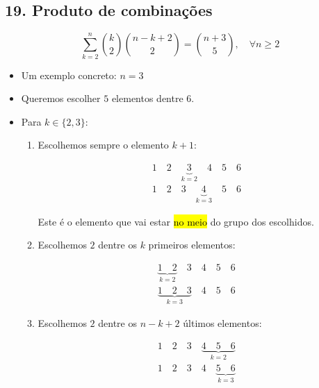 \documentclass[
  11pt]{report}
\begin{document}
\hypertarget{produto-de-combinauxe7uxf5es}{%
\subsection*{19. Produto de combinações}\label{produto-de-combinauxe7uxf5es}}

\begin{rmdbox}
\[
\sum_{k=2}^n \binom k2 \binom{n-k+2}{2} = \binom{n+3}{5}, \quad \forall n \geq 2
\]

\end{rmdbox}

\begin{itemize}
\item
  Um exemplo concreto: $n = 3$
\item
  Queremos escolher $5$ elementos dentre $6$.
\item
  Para $k \in \{ 2, 3 \}$:

  \begin{enumerate}
  \def\labelenumi{\arabic{enumi}.}
  \item
    Escolhemos sempre o elemento $k + 1$:

    \[
    \begin{aligned}
    1 \quad 2 \quad \underbrace{3}_{k = 2} \quad 4 \quad 5 \quad 6 \\
    1 \quad 2 \quad 3 \quad \underbrace{4}_{k = 3} \quad 5 \quad 6
    \end{aligned}
    \]

    Este é o elemento que vai estar {\hl{no meio}} do grupo dos escolhidos.
  \item
    Escolhemos $2$ dentre os $k$ primeiros elementos:

    \[
    \begin{aligned}
    \underbrace{1 \quad 2}_{k = 2} \quad 3 \quad 4 \quad 5 \quad 6 \\
    \underbrace{1 \quad 2 \quad 3}_{k = 3} \quad 4 \quad 5 \quad 6
    \end{aligned}
    \]
  \item
    Escolhemos $2$ dentre os $n - k + 2$ últimos elementos:

    \[
    \begin{aligned}
    1 \quad 2 \quad 3 \quad \underbrace{4 \quad 5 \quad 6}_{k = 2}\\
    1 \quad 2 \quad 3 \quad 4 \quad \underbrace{5 \quad 6}_{k = 3}
    \end{aligned}
    \]
  \end{enumerate}
\end{itemize}
\end{document}
